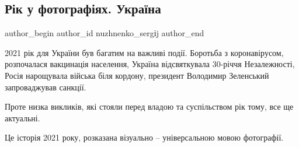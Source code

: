 
 
 
 
 
\subsection{Рік у фотографіях. Україна}
\label{sec:17_01_2022.stz.news.ua.radiosvoboda.1.ukraina_rik_foto}

\ifcmt
 author_begin
   author_id nuzhnenko_sergіj
 author_end
\fi

\begin{zznagolos}
2021 рік для України був багатим на важливі події. Боротьба з коронавірусом,
розпочалася вакцинація населення, Україна відсвяткувала 30-річчя Незалежності,
Росія нарощувала війська біля кордону, президент Володимир Зеленський
запроваджував санкції.

Проте низка викликів, які стояли перед владою та суспільством рік тому, все ще
актуальні.

Це історія 2021 року, розказана візуально – універсальною мовою фотографії.
\end{zznagolos}

